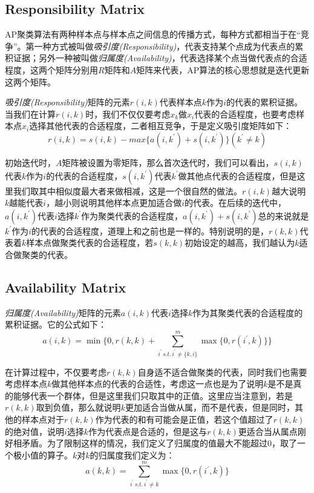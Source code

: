 \documentclass[UTF8, 12pt]{ctexart}
\begin{document}
	\subsection{Responsibility Matrix}
	AP聚类算法有两种样本点与样本点之间信息的传播方式，每种方式都相当于在“竞争”。第一种方式被叫做\emph{吸引度(Responsibility)}，代表支持某个点成为代表点的累积证据；另外一种被叫做\emph{归属度(Availability)}，代表选择某个点当做代表点的合适程度，这两个矩阵分别用$R$矩阵和$A$矩阵来代表，AP算法的核心思想就是迭代更新这两个矩阵。
	
	\emph{吸引度(Responsibility)}矩阵的元素$r(i,k)$代表样本点$k$作为$i$的代表的累积证据。当我们在计算$r(i,k)$时，我们不仅仅要考虑$x_{k}$做$x_{i}$代表的合适程度，也要考虑样本点$x_{i}$选择其他代表的合适程度，二者相互竞争，于是定义吸引度矩阵如下：
	\begin{equation}
	r(i,k) = s(i,k) - max\{ a(i,k^{'}) + s(i,{k^{'}})\} ({k^{'}} \ne k)
	\end{equation}
	
	初始迭代时，$A$矩阵被设置为零矩阵，那么首次迭代时，我们可以看出，$s(i,k)$代表$k$作为$i$的代表的合适程度，$s(i,k^{'})$代表$k^{'}$做其他点代表的合适程度，但是这里我们取其中相似度最大者来做相减，这是一个很自然的做法。$r(i,k)$越大说明$k$越能代表$i$，越小则说明其他样本点更加适合做$i$的代表。在后续的迭代中，$a(i,k^{'})$代表$i$选择$k^{'}$作为聚类代表的合适程度，$a(i,k^{'})+s(i,k^{'})$总的来说就是$k^{'}$作为$i$的代表的合适程度，道理上和之前也是一样的。特别说明的是，$r(k,k)$代表着$k$样本点做聚类代表的合适程度，若$s(k,k)$初始设定的越高，我们越认为$k$适合做聚类的代表。
	
	\subsection{Availability Matrix}
	\emph{归属度(Availability)}矩阵的元素$a(i,k)$代表$i$选择$k$作为其聚类代表的合适程度的累积证据。它的公式如下：
	\begin{equation}
	a(i,k) = \min \{ 0,r(k,k) + \sum\limits_{{i^{'}} \, s.t. \, {i^{'}} \ne \{k, i\}}^m {\max \{ 0,r({i^{'}},k)\} } \}
	\end{equation}
	
	在计算过程中，不仅要考虑$r(k,k)$自身适不适合做聚类的代表，同时我们也需要考虑样本点$k$做其他样本点的代表的合适性，考虑这一点也是为了说明$k$是不是真的能够代表一个群体，但是这里我们只取其中的正值。这里应当注意到，若是$r(k,k)$取到负值，那么就说明$k$更加适合当做从属，而不是代表，但是同时，其他的样本点对于$r(k,k)$作为代表的和有可能会是正值，若这个值超过了$r(k,k)$的绝对值，说明$i$选择$k$作为代表点是合适的，但是这与$r(k,k)$更适合当从属点刚好相矛盾。为了限制这样的情况，我们定义了归属度的值最大不能超过0，取了一个极小值的算子。$k$对$k$的归属度我们定义为：
	\begin{equation}
	a(k,k) = \sum\limits_{{i^{'}} \, s.t. \, {i^{'}} \ne k}^m {\max \{ 0,r({i^{'}},k)\} }
	\end{equation}
	
\end{document}
